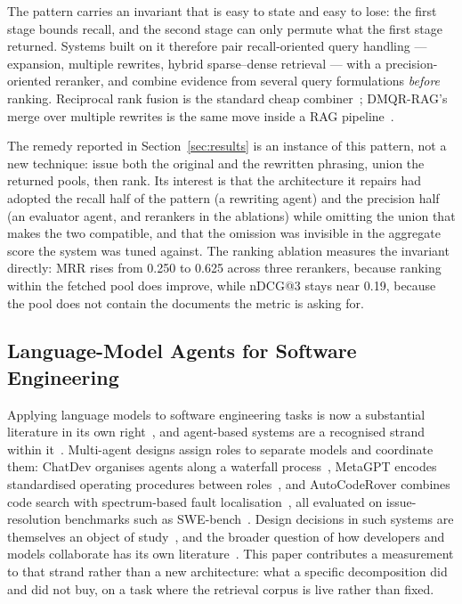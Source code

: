 \documentclass[acmsmall,review,anonymous,screen]{acmart}
\begin{document}
The pattern carries an invariant that is easy to state and easy to lose: the
first stage bounds recall, and the second stage can only permute what the first
stage returned. Systems built on it therefore pair recall-oriented query handling
--- expansion, multiple rewrites, hybrid sparse--dense retrieval --- with a
precision-oriented reranker, and combine evidence from several query formulations
\emph{before} ranking. Reciprocal rank fusion is the standard cheap
combiner~\cite{cormack2009rrf}; DMQR-RAG's merge over multiple rewrites is the
same move inside a RAG pipeline~\cite{gao2024dmqr}.

The remedy reported in Section~\ref{sec:results} is an instance of this pattern,
not a new technique: issue both the original and the rewritten phrasing, union
the returned pools, then rank. Its interest is that the architecture it repairs
had adopted the recall half of the pattern (a rewriting agent) and the precision
half (an evaluator agent, and rerankers in the ablations) while omitting the
union that makes the two compatible, and that the omission was invisible in the
aggregate score the system was tuned against. The ranking ablation measures the
invariant directly: MRR rises from 0.250 to 0.625 across three rerankers, because
ranking within the fetched pool does improve, while nDCG@3 stays near 0.19,
because the pool does not contain the documents the metric is asking for.

\subsection{Language-Model Agents for Software Engineering}

Applying language models to software engineering tasks is now a substantial
literature in its own right~\cite{fan2023llmse,hou2024llm4se}, and agent-based
systems are a recognised strand within it~\cite{liu2026agentsurvey}. Multi-agent
designs assign roles to separate models and coordinate them: ChatDev organises
agents along a waterfall process~\cite{qian2024chatdev}, MetaGPT encodes
standardised operating procedures between roles~\cite{hong2024metagpt}, and
AutoCodeRover combines code search with spectrum-based fault
localisation~\cite{zhang2024autocoderover}, all evaluated on issue-resolution
benchmarks such as SWE-bench~\cite{jimenez2024swebench}. Design decisions in such
systems are themselves an object of study~\cite{batole2025designissue}, and the
broader question of how developers and models collaborate has its own
literature~\cite{liang2024survey,barke2023copilot,stray2025humanai,treude2025taxonomy}.
This paper contributes a measurement to that strand rather than a new
architecture: what a specific decomposition did and did not buy, on a task where
the retrieval corpus is live rather than fixed.
\end{document}
